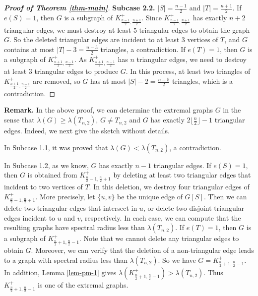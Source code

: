 \documentclass[11pt]{article}
\begin{document}
\begin{proof}[{\bf Proof of Theorem \ref{thm-main}}]
{\bf Subcase 2.2.}  $|S|= \frac{n-1}{2} $ and $|T|=\frac{n+1}{2}$. 
If $e(S)=1$, then $G$ is a subgraph of $K_{\frac{n-1}{2} , \frac{n+1}{2} }^+$. Since $K_{\frac{n-1}{2} , \frac{n+1}{2} }^+$ has exactly 
$n+2$ triangular edges, we must destroy at least 
$5$ triangular edges to obtain the graph $G$. 
So the deleted triangular edges are incident to at least $3$ vertices of $T$, and $G$ contains at most $|T|-3=\frac{n-5}{2}$ triangles, 
a contradiction. 
If $e(T)=1$, then $G$ is a subgraph of $K_{\frac{n+1}{2} , \frac{n-1}{2} }^+$. As  $K_{\frac{n+1}{2} , \frac{n-1}{2} }^+$ has 
$n$ triangular edges, we need to destroy at least 
$3$ triangular edges to produce  $G$. 
In this process, 
at least two triangles of $K_{\frac{n+1}{2} , \frac{n-1}{2} }^+$ 
are removed, so $G$ has at most $|S|-2=\frac{n-5}{2}$ triangles, 
which is a contradiction.  
\end{proof}

\noindent 
{\bf Remark.} 
In the above proof,  we can determine 
the extremal graphs $G$ in the sense that
 $\lambda (G)\ge \lambda (T_{n,2})$, $G\neq T_{n,2}$ and $G$ has exactly $2\lfloor \frac{n}{2}\rfloor -1$ triangular edges. 
Indeed, we next give the sketch without details. 

\medskip  
In Subcase 1.1, it was proved that 
$\lambda (G) < \lambda (T_{n,2})$, a contradiction. 


In Subcase 1.2, 
as we know, $G$ has exactly $n-1$ triangular edges. 
If $e(S)=1$,   
then $G$ is obtained  
from $K_{\frac{n}{2}-1,\frac{n}{2}+1}^+$ 
by deleting at least two triangular edges that incident to 
two vertices of $T$. 
In this deletion, we destroy 
four triangular edges of $K_{\frac{n}{2}-1,\frac{n}{2}+1}^+$. 
More precisely, let $\{u,v\}$ be the unique edge of $G[S]$. Then we can delete two triangular edges 
that intersect in $u$, or delete two disjoint triangular edges incident to $u$ and $v$, respectively. 
In each case, we can compute that 
the resulting graphs have spectral radius less than $\lambda (T_{n,2})$.  
If $e(T)=1$, then $G$ is a subgraph of $K_{\frac{n}{2} +1, \frac{n}{2} -1}^+$. 
Note that we cannot delete any triangular edges to obtain $G$.  
Moreover, we can verify that 
the deletion of a non-triangular edge
leads to a graph with spectral radius less than $\lambda (T_{n,2})$. 
So we have $G=K_{\frac{n}{2} +1, \frac{n}{2} -1}^+$. 
In addition, Lemma \ref{lem-pm-1} gives 
 $\lambda (K_{\frac{n}{2} +1, \frac{n}{2} -1}^+) > \lambda (T_{n,2})$. 
Thus $K_{\frac{n}{2} +1, \frac{n}{2} -1}^+$ is 
one of the extremal graphs.  
\end{document}
